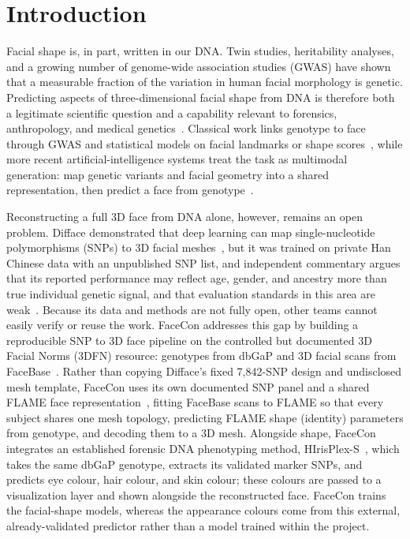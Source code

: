 \chapter{Introduction}
\label{ch:intro}
Facial shape is, in part, written in our DNA. Twin studies, heritability analyses, and a growing number of genome-wide association studies (GWAS) have shown that a measurable fraction of the variation in human facial morphology is genetic. Predicting aspects of three-dimensional facial shape from DNA is therefore both a legitimate scientific question and a capability relevant to forensics, anthropology, and medical genetics~\cite{ref:wang,ref:richmond}. Classical work links genotype to face through GWAS and statistical models on facial landmarks or shape scores~\cite{ref:xiong,ref:claes}, while more recent artificial-intelligence systems treat the task as multimodal generation: map genetic variants and facial geometry into a shared representation, then predict a face from genotype~\cite{ref:difface}.

Reconstructing a full 3D face from DNA alone, however, remains an open problem. Difface demonstrated that deep learning can map single-nucleotide polymorphisms (SNPs) to 3D facial meshes~\cite{ref:difface}, but it was trained on private Han Chinese data with an unpublished SNP list, and independent commentary argues that its reported performance may reflect age, gender, and ancestry more than true individual genetic signal, and that evaluation standards in this area are weak~\cite{ref:comment}. Because its data and methods are not fully open, other teams cannot easily verify or reuse the work. FaceCon addresses this gap by building a reproducible SNP to 3D face pipeline on the controlled but documented 3D Facial Norms (3DFN) resource: genotypes from dbGaP and 3D facial scans from FaceBase~\cite{ref:facebase,ref:dbgap}. Rather than copying Difface's fixed 7,842-SNP design and undisclosed mesh template, FaceCon uses its own documented SNP panel and a shared FLAME face representation~\cite{ref:flame}, fitting FaceBase scans to FLAME so that every subject shares one mesh topology, predicting FLAME shape (identity) parameters from genotype, and decoding them to a 3D mesh. Alongside shape, FaceCon integrates an established forensic DNA phenotyping method, HIrisPlex-S~\cite{ref:hirisplex,ref:hirisplexs}, which takes the same dbGaP genotype, extracts its validated marker SNPs, and predicts eye colour, hair colour, and skin colour; these colours are passed to a visualization layer and shown alongside the reconstructed face. FaceCon trains the facial-shape models, whereas the appearance colours come from this external, already-validated predictor rather than a model trained within the project.

